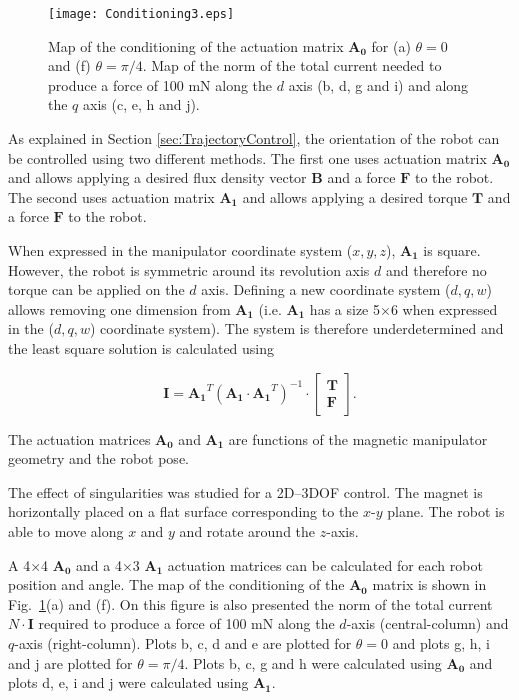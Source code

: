 \begin{figure}
	\texttt{[image: Conditioning3.eps]}
	\caption{Map of the conditioning of the actuation matrix $\mathbf{A_0}$ for (a) $\theta=0$ and (f) $\theta=\pi/4$. 
	Map of the norm of the total current needed to produce a force of 100 mN along the $d$ axis (b, d, g and i) and along the $q$ axis (c, e, h and j).  }
	\label{condition}
\end{figure}


As explained in Section \ref{sec:TrajectoryControl}, the orientation of the robot can be controlled using two different methods. 
 The first one uses actuation matrix $\mathbf{A_0}$ and allows applying a desired flux density vector $\mathbf{B}$ and a force $\mathbf{F}$ to the robot. 
 The second uses actuation matrix $\mathbf{A_1}$ and allows applying a desired torque $\mathbf{T}$ and a force $\mathbf{F}$ to the robot.

When expressed in the manipulator coordinate system ($x,y,z$), $\mathbf{A_1}$ is square. However, the robot is symmetric around its revolution axis $d$ and therefore no torque can be applied on the $d$ axis. Defining a new coordinate system ($d,q,w$) allows removing one dimension from $\mathbf{A_1}$ (i.e. $\mathbf{A_1}$ has a size 5$\times$6 when expressed in the ($d,q,w$) coordinate system). The system is therefore underdetermined and the least square solution is calculated using 
 
\begin{equation}
\label{LS}
\mathbf{I}=\mathbf{A_1}^{T}\left ( \mathbf{A_1} \cdot \mathbf{A_1}^{T} \right )^{-1}\cdot \begin{bmatrix}
\mathbf{T}
\\ 
\mathbf{F}
\end{bmatrix}.
\end{equation}

The actuation matrices $\mathbf{A_0}$ and $\mathbf{A_1}$ are functions of the magnetic manipulator geometry and the robot pose. 

The effect of singularities was studied for a 2D--3DOF control. The magnet is horizontally placed on a flat surface corresponding to the $x$-$y$ plane. The robot is able to move along $x$ and $y$ and rotate around the $z$-axis.

A 4$\times$4 $\mathbf{A_0}$ and a 4$\times$3 $\mathbf{A_1}$ actuation matrices can be calculated for each robot position and angle. The map of the conditioning of the $\mathbf{A_0}$ matrix is shown in Fig.~\ref{condition}(a) and (f). On this figure is also presented the norm of the total current $N \cdot \mathbf{I}$ required to produce a force of 100 mN along the $d$-axis (central-column) and $q$-axis (right-column). Plots b, c, d and e are plotted for $\theta=0$ and plots g, h, i and j are plotted for $\theta=\pi/4$. Plots b, c, g and h were calculated using $\mathbf{A_0}$ and plots d, e, i and j were calculated using $\mathbf{A_1}$.

